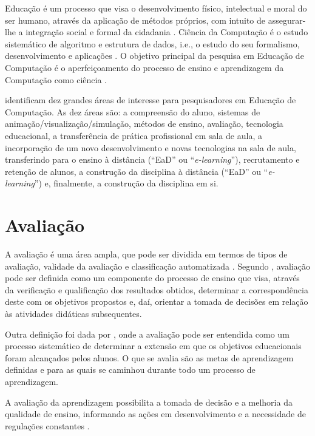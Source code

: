 Educação é um processo que visa o desenvolvimento físico, intelectual e moral do ser humano, através da aplicação de métodos próprios, com intuito de assegurar-lhe a integração social e formal da cidadania \cite{weiszflog1999michaelis}. Ciência da Computação é o estudo sistemático de algoritmo e estrutura de dados, i.e., o estudo do seu formalismo, desenvolvimento e aplicações \cite{gibbs1986model}. O objetivo principal da pesquisa em Educação de Computação é o aperfeiçoamento do processo de ensino e aprendizagem da Computação como ciência \cite{holmboe2001research}.

 identificam dez grandes áreas de interesse para pesquisadores em Educação de Computação. As dez áreas são: a compreensão do aluno, sistemas de animação/visualização/simulação, métodos de ensino, avaliação, tecnologia educacional, a transferência de prática profissional em sala de aula, a incorporação de um novo desenvolvimento e novas tecnologias na sala de aula, transferindo para o ensino à distância (“EaD” ou “\textit{e-learning}”), recrutamento e retenção de alunos, a construção da disciplina à distância (“EaD” ou “\textit{e-learning}”) e, finalmente, a construção da disciplina em si. 


\section{Avaliação}
\label{sec:AVA}
A avaliação é uma área ampla, que pode ser dividida em termos de tipos de avaliação, validade da avaliação e classificação automatizada \cite{fincher2005mapping}. Segundo , avaliação pode ser definida como um componente do processo de ensino que visa, através da verificação e qualificação dos resultados obtidos, determinar a correspondência  deste com os objetivos propostos e, daí, orientar a tomada de decisões em relação às atividades didáticas subsequentes.

Outra definição foi dada por , onde a avaliação pode ser entendida como um processo sistemático de determinar a extensão em que os objetivos educacionais foram alcançados pelos alunos. O que se avalia são as metas de aprendizagem definidas e para as quais se caminhou durante todo um processo de aprendizagem.

A avaliação da aprendizagem possibilita a tomada de decisão e a melhoria da qualidade de ensino, informando as ações em desenvolvimento e a necessidade de regulações constantes \cite{kraemer2005avaliaccao}.

